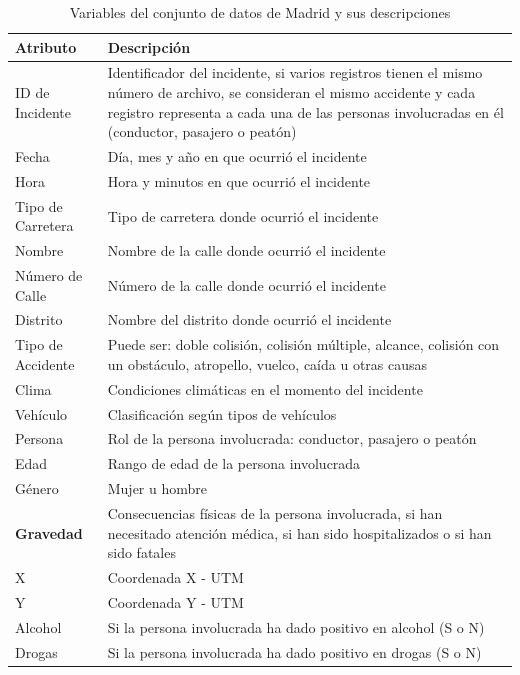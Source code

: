 \begin{table}[ht]
	\begin{center}
		\begin{tabular}{|p{3cm}|p{11cm}|}
			\hline
			\textbf{Atributo} & \textbf{Descripción} \\ \hline \hline
			ID de Incidente  & Identificador del incidente, si varios registros tienen el mismo número de archivo, se consideran el mismo accidente y cada registro representa a cada una de las personas involucradas en él (conductor, pasajero o peatón)  \\ \hline
			Fecha  & Día, mes y año en que ocurrió el incidente \\ \hline
			Hora  & Hora y minutos en que ocurrió el incidente \\ \hline
			Tipo de Carretera & Tipo de carretera donde ocurrió el incidente \\ \hline
			Nombre & Nombre de la calle donde ocurrió el incidente \\ \hline
			Número de Calle & Número de la calle donde ocurrió el incidente  \\ \hline
			Distrito & Nombre del distrito donde ocurrió el incidente \\ \hline
			Tipo de Accidente  & Puede ser: doble colisión, colisión múltiple, alcance, colisión con un obstáculo, atropello, vuelco, caída u otras causas \\ \hline
			Clima  & Condiciones climáticas en el momento del incidente \\ \hline
			Vehículo  & Clasificación según tipos de vehículos \\ \hline
			Persona  & Rol de la persona involucrada: conductor, pasajero o peatón \\ \hline
			Edad  & Rango de edad de la persona involucrada \\ \hline
			Género  & Mujer u hombre \\ \hline
			\textbf{Gravedad}  & Consecuencias físicas de la persona involucrada, si han necesitado atención médica, si han sido hospitalizados o si han sido fatales \\ \hline
			X   & Coordenada X - UTM \\ \hline
			Y   & Coordenada Y - UTM \\ \hline
			Alcohol & Si la persona involucrada ha dado positivo en alcohol (S o N) \\ \hline
			Drogas & Si la persona involucrada ha dado positivo en drogas (S o N) \\ \hline \hline
		\end{tabular}
	\end{center}
	\caption{Variables del conjunto de datos de Madrid y sus descripciones}
	\label{Datadescription}
\end{table}

